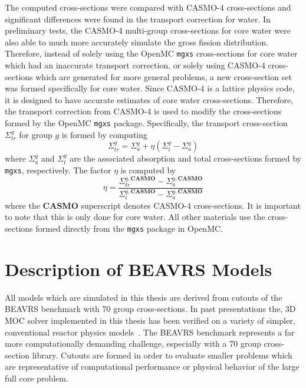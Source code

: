 \clearpage

The computed cross-sections were compared with CASMO-4 cross-sections and significant differences were found in the transport correction for water. In preliminary tests, the CASMO-4 multi-group cross-sections for core water were also able to much more accurately simulate the gross fission distribution. Therefore, instead of solely using the OpenMC \texttt{mgxs} cross-sections for core water which had an inaccurate transport correction, or solely using CASMO-4 cross-sections which are generated for more general problems, a new cross-section set was formed specifically for core water. Since CASMO-4 is a lattice physics code, it is designed to have accurate estimates of core water cross-sections. Therefore, the transport correction from CASMO-4 is used to modify the cross-sections formed by the OpenMC \texttt{mgxs} package. Specifically, the transport cross-section $\Sigma_{tr}^g$ for group $g$ is formed by computing
\begin{equation}
\Sigma_{tr}^g = \Sigma_{a}^g + \eta \left( \Sigma_{t}^g - \Sigma_{a}^g \right)
\end{equation}
where $\Sigma_{a}^g$ and $\Sigma_{t}^g$ are the associated absorption and total cross-sections formed by \texttt{mgxs}, respectively. The factor $\eta$ is computed by
\begin{equation}
\eta = \frac{\Sigma_{tr}^{g, \textbf{CASMO}} - \Sigma_{a}^{g, \textbf{CASMO}}}{\Sigma_{t}^{g, \textbf{CASMO}} - \Sigma_{a}^{g, \textbf{CASMO}}}
\end{equation}
where the \textbf{CASMO} superscript denotes CASMO-4 cross-sections. It is important to note that this is only done for core water. All other materials use the cross-sections formed directly from the \texttt{mgxs} package in OpenMC.

\section{Description of BEAVRS Models}
\label{sec:beavrs-models}

All models which are simulated in this thesis are derived from cutouts of the BEAVRS benchmark with 70 group cross-sections. In past presentations the, 3D \ac{MOC} solver implemented in this thesis has been verified on a variety of simpler, conventional reactor physics models~\cite{physor2016shaner, physor2016otf}. The BEAVRS benchmark represents a far more computationally demanding challenge, especially with a 70 group cross-section library. Cutouts are formed in order to evaluate smaller problems which are representative of computational performance or physical behavior of the large full core problem.

